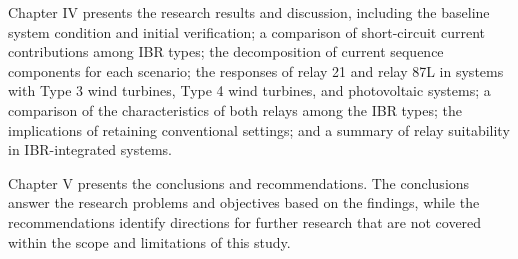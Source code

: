 \noindent Chapter IV presents the research results and discussion, including the baseline system condition and initial verification; a comparison of short-circuit current contributions among IBR types; the decomposition of current sequence components for each scenario; the responses of relay 21 and relay 87L in systems with Type 3 wind turbines, Type 4 wind turbines, and photovoltaic systems; a comparison of the characteristics of both relays among the IBR types; the implications of retaining conventional settings; and a summary of relay suitability in IBR-integrated systems.

\noindent Chapter V presents the conclusions and recommendations. The conclusions answer the research problems and objectives based on the findings, while the recommendations identify directions for further research that are not covered within the scope and limitations of this study.
